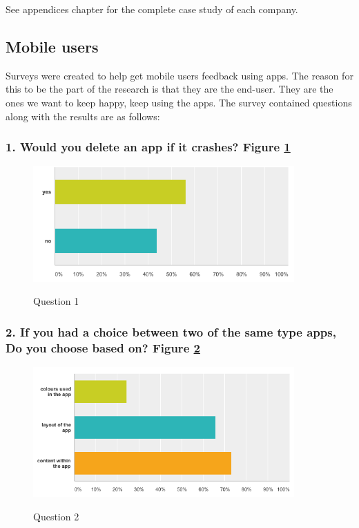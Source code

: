See appendices chapter for the complete case study of each company. 

\subsection{Mobile users} \label{research:mobile_users}

Surveys were created to help get mobile users feedback using apps. The reason for this to be the part of the research is that they are the end-user. They are the ones we want to keep happy, keep using the apps. The survey contained questions along with the results are as follows:

\subsubsection{1. Would you delete an app if it crashes? Figure \ref{fig:label1}}

\begin{figure}[!h]
    \caption{Question 1}
    \centering
    \includegraphics[width=100mm]{images/survey/crashes}
    \label{fig:label1}
\end{figure}

\subsubsection{2. If you had a choice between two of the same type apps, Do you choose based on?  Figure \ref{fig:label2}}

\begin{figure}[!h]
    \caption{Question 2}
    \centering
    \includegraphics[width=100mm]{images/survey/choose}
    \label{fig:label2}
\end{figure}

